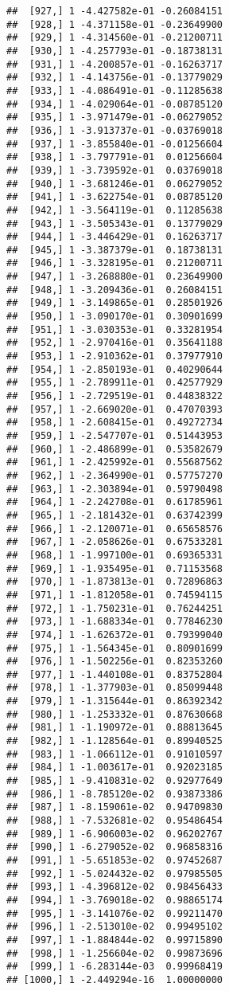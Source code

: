 \documentclass[
  12pt,
]{article}
\begin{document}
\begin{verbatim}
##  [927,] 1 -4.427582e-01 -0.26084151
##  [928,] 1 -4.371158e-01 -0.23649900
##  [929,] 1 -4.314560e-01 -0.21200711
##  [930,] 1 -4.257793e-01 -0.18738131
##  [931,] 1 -4.200857e-01 -0.16263717
##  [932,] 1 -4.143756e-01 -0.13779029
##  [933,] 1 -4.086491e-01 -0.11285638
##  [934,] 1 -4.029064e-01 -0.08785120
##  [935,] 1 -3.971479e-01 -0.06279052
##  [936,] 1 -3.913737e-01 -0.03769018
##  [937,] 1 -3.855840e-01 -0.01256604
##  [938,] 1 -3.797791e-01  0.01256604
##  [939,] 1 -3.739592e-01  0.03769018
##  [940,] 1 -3.681246e-01  0.06279052
##  [941,] 1 -3.622754e-01  0.08785120
##  [942,] 1 -3.564119e-01  0.11285638
##  [943,] 1 -3.505343e-01  0.13779029
##  [944,] 1 -3.446429e-01  0.16263717
##  [945,] 1 -3.387379e-01  0.18738131
##  [946,] 1 -3.328195e-01  0.21200711
##  [947,] 1 -3.268880e-01  0.23649900
##  [948,] 1 -3.209436e-01  0.26084151
##  [949,] 1 -3.149865e-01  0.28501926
##  [950,] 1 -3.090170e-01  0.30901699
##  [951,] 1 -3.030353e-01  0.33281954
##  [952,] 1 -2.970416e-01  0.35641188
##  [953,] 1 -2.910362e-01  0.37977910
##  [954,] 1 -2.850193e-01  0.40290644
##  [955,] 1 -2.789911e-01  0.42577929
##  [956,] 1 -2.729519e-01  0.44838322
##  [957,] 1 -2.669020e-01  0.47070393
##  [958,] 1 -2.608415e-01  0.49272734
##  [959,] 1 -2.547707e-01  0.51443953
##  [960,] 1 -2.486899e-01  0.53582679
##  [961,] 1 -2.425992e-01  0.55687562
##  [962,] 1 -2.364990e-01  0.57757270
##  [963,] 1 -2.303894e-01  0.59790498
##  [964,] 1 -2.242708e-01  0.61785961
##  [965,] 1 -2.181432e-01  0.63742399
##  [966,] 1 -2.120071e-01  0.65658576
##  [967,] 1 -2.058626e-01  0.67533281
##  [968,] 1 -1.997100e-01  0.69365331
##  [969,] 1 -1.935495e-01  0.71153568
##  [970,] 1 -1.873813e-01  0.72896863
##  [971,] 1 -1.812058e-01  0.74594115
##  [972,] 1 -1.750231e-01  0.76244251
##  [973,] 1 -1.688334e-01  0.77846230
##  [974,] 1 -1.626372e-01  0.79399040
##  [975,] 1 -1.564345e-01  0.80901699
##  [976,] 1 -1.502256e-01  0.82353260
##  [977,] 1 -1.440108e-01  0.83752804
##  [978,] 1 -1.377903e-01  0.85099448
##  [979,] 1 -1.315644e-01  0.86392342
##  [980,] 1 -1.253332e-01  0.87630668
##  [981,] 1 -1.190972e-01  0.88813645
##  [982,] 1 -1.128564e-01  0.89940525
##  [983,] 1 -1.066112e-01  0.91010597
##  [984,] 1 -1.003617e-01  0.92023185
##  [985,] 1 -9.410831e-02  0.92977649
##  [986,] 1 -8.785120e-02  0.93873386
##  [987,] 1 -8.159061e-02  0.94709830
##  [988,] 1 -7.532681e-02  0.95486454
##  [989,] 1 -6.906003e-02  0.96202767
##  [990,] 1 -6.279052e-02  0.96858316
##  [991,] 1 -5.651853e-02  0.97452687
##  [992,] 1 -5.024432e-02  0.97985505
##  [993,] 1 -4.396812e-02  0.98456433
##  [994,] 1 -3.769018e-02  0.98865174
##  [995,] 1 -3.141076e-02  0.99211470
##  [996,] 1 -2.513010e-02  0.99495102
##  [997,] 1 -1.884844e-02  0.99715890
##  [998,] 1 -1.256604e-02  0.99873696
##  [999,] 1 -6.283144e-03  0.99968419
## [1000,] 1 -2.449294e-16  1.00000000
\end{verbatim}
\end{document}
